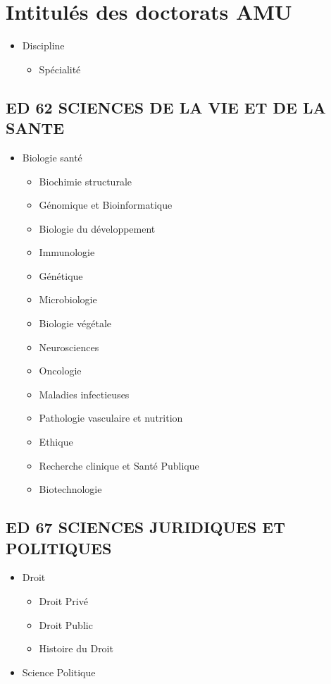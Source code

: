 \section{Intitulés des doctorats AMU}

		\begin{itemize}
		\item Discipline
			\begin{itemize}
			\item Spécialité
			\end{itemize}
		\end{itemize}
		
	\subsection*{ED 62 SCIENCES DE LA VIE ET DE LA SANTE}\label{ed-62-sciences-de-la-vie-et-de-la-sante}

		\begin{itemize}
		\item Biologie santé
			\begin{itemize}
			\item Biochimie structurale
			\item Génomique et  Bioinformatique
			\item Biologie du développement
			\item Immunologie
			\item Génétique
			\item Microbiologie
			\item Biologie végétale
			\item Neurosciences
			\item Oncologie
			\item Maladies infectieuses
			\item Pathologie vasculaire et nutrition
			\item Ethique
			\item Recherche clinique et Santé Publique
			\item Biotechnologie
			\end{itemize}
		\end{itemize}

	\subsection*{ED 67 SCIENCES JURIDIQUES ET POLITIQUES}\label{ed-67-sciences-juridiques-et-politiques}

		\begin{itemize}
		\item Droit
			\begin{itemize}
			\item Droit Privé
			\item Droit Public
			\item Histoire du Droit
			\end{itemize}
		\item Science Politique
		\end{itemize}

